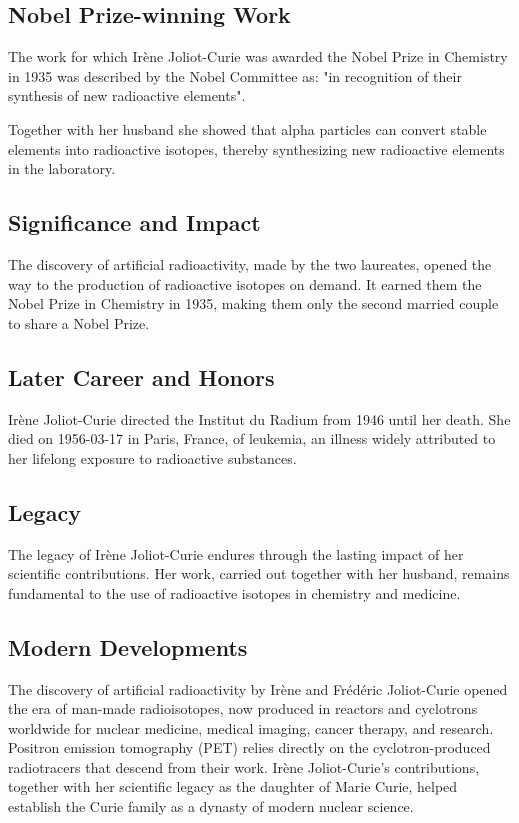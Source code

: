 \subsection*{Nobel Prize-winning Work}

The work for which Irène Joliot-Curie was awarded the Nobel Prize in Chemistry in 1935 was described by the Nobel Committee as: "in recognition of their synthesis of new radioactive elements".

Together with her husband she showed that alpha particles can convert stable elements into radioactive isotopes, thereby synthesizing new radioactive elements in the laboratory.

\subsection*{Significance and Impact}

The discovery of artificial radioactivity, made by the two laureates, opened the way to the production of radioactive isotopes on demand.
It earned them the Nobel Prize in Chemistry in 1935, making them only the second married couple to share a Nobel Prize.

\subsection*{Later Career and Honors}

Irène Joliot-Curie directed the Institut du Radium from 1946 until her death.
She died on 1956-03-17 in Paris, France, of leukemia, an illness widely attributed to her lifelong exposure to radioactive substances.

\subsection*{Legacy}

The legacy of Irène Joliot-Curie endures through the lasting impact of her scientific contributions.
Her work, carried out together with her husband, remains fundamental to the use of radioactive isotopes in chemistry and medicine.

\subsection*{Modern Developments}

The discovery of artificial radioactivity by Irène and Frédéric Joliot-Curie opened the era of man-made radioisotopes, now produced in reactors and cyclotrons worldwide for nuclear medicine, medical imaging, cancer therapy, and research. Positron emission tomography (PET) relies directly on the cyclotron-produced radiotracers that descend from their work. Irène Joliot-Curie's contributions, together with her scientific legacy as the daughter of Marie Curie, helped establish the Curie family as a dynasty of modern nuclear science.

